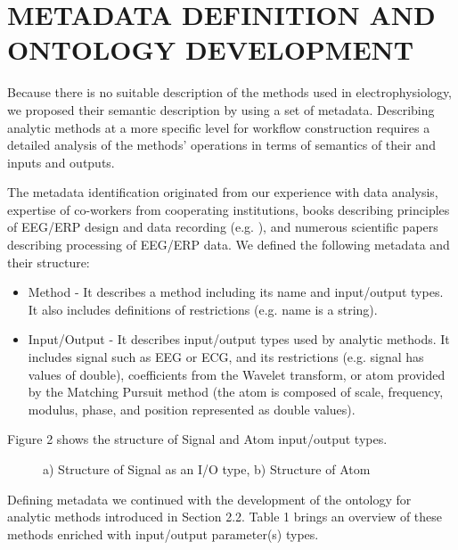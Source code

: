 \documentclass[a4paper,twoside]{article}
\begin{document}
\section{\uppercase{Metadata Definition and Ontology Development}}

\noindent Because there is no suitable description of the methods used in electrophysiology, we proposed their semantic description by using a set of metadata. Describing analytic methods at a more specific level for workflow construction requires a detailed analysis of the methods' operations in terms of semantics of their and inputs and outputs.

The metadata identification originated from our experience with data analysis, expertise of co-workers from cooperating institutions, books describing principles of EEG/ERP design and data recording (e.g. \cite{Luck05}), and numerous scientific papers describing processing of EEG/ERP data. We defined the following metadata and their structure:
\begin{itemize}
	\item Method - It describes a method including its name and input/output types. It also includes definitions of restrictions (e.g. name is a string).
	
	\item Input/Output - It describes input/output types used by analytic methods. It includes signal such as EEG or ECG, and its restrictions (e.g. signal has values of double), coefficients from the Wavelet transform, or atom provided by the Matching Pursuit method (the atom is composed of scale, frequency, modulus, phase, and position represented as double values).
	
\end{itemize}

Figure 2 shows the structure of Signal and Atom input/output types.

\begin{figure}[!h]

  \centering
   {}
  \caption{a) Structure of Signal as an I/O type, b) Structure of Atom }
  \label{fig:SignalAndAtom}
 \end{figure}

Defining metadata we continued with the development of the ontology for analytic methods introduced in Section 2.2. Table 1 brings an overview of these methods enriched with input/output parameter(s) types.
\end{document}
